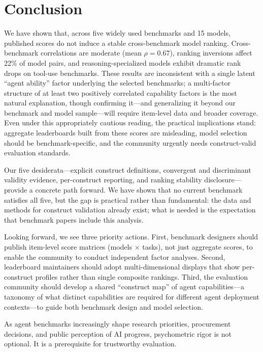\documentclass[11pt]{article}
\begin{document}
\section{Conclusion}
We have shown that, across five widely used benchmarks and 15 models, published scores do not induce a stable cross-benchmark model ranking. Cross-benchmark correlations are moderate (mean $\rho = 0.67$), ranking inversions affect 22\% of model pairs, and reasoning-specialized models exhibit dramatic rank drops on tool-use benchmarks. These results are inconsistent with a single latent ``agent ability'' factor underlying the selected benchmarks; a multi-factor structure of at least two positively correlated capability factors is the most natural explanation, though confirming it---and generalizing it beyond our benchmark and model sample---will require item-level data and broader coverage. Even under this appropriately cautious reading, the practical implications stand: aggregate leaderboards built from these scores are misleading, model selection should be benchmark-specific, and the community urgently needs construct-valid evaluation standards.

Our five desiderata---explicit construct definitions, convergent and discriminant validity evidence, per-construct reporting, and ranking stability disclosure---provide a concrete path forward. We have shown that no current benchmark satisfies all five, but the gap is practical rather than fundamental: the data and methods for construct validation already exist; what is needed is the expectation that benchmark papers include this analysis.

Looking forward, we see three priority actions. First, benchmark designers should publish item-level score matrices (models $\times$ tasks), not just aggregate scores, to enable the community to conduct independent factor analyses. Second, leaderboard maintainers should adopt multi-dimensional displays that show per-construct profiles rather than single composite rankings. Third, the evaluation community should develop a shared ``construct map'' of agent capabilities---a taxonomy of what distinct capabilities are required for different agent deployment contexts---to guide both benchmark design and model selection.

As agent benchmarks increasingly shape research priorities, procurement decisions, and public perception of AI progress, psychometric rigor is not optional. It is a prerequisite for trustworthy evaluation.
\end{document}
